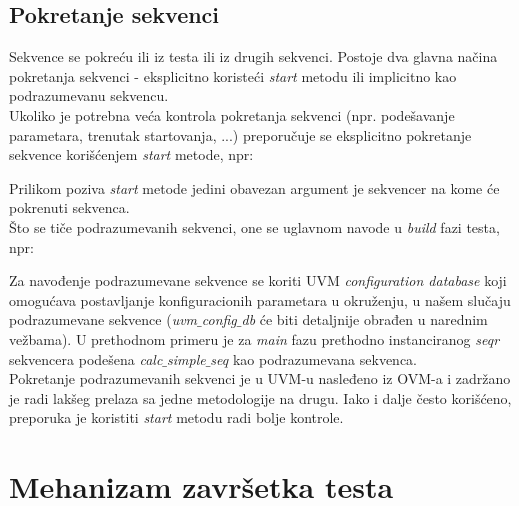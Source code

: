 
\subsection{Pokretanje sekvenci}

Sekvence se pokreću ili iz testa ili iz drugih sekvenci. Postoje dva glavna
načina pokretanja sekvenci - eksplicitno koristeći \emph{start} metodu ili
implicitno kao podrazumevanu sekvencu.\\

Ukoliko je potrebna veća kontrola pokretanja sekvenci (npr. podešavanje
parametara, trenutak startovanja, ...) preporučuje se eksplicitno pokretanje
sekvence korišćenjem \emph{start} metode, npr:



Prilikom poziva \emph{start} metode jedini obavezan argument je sekvencer na
kome će pokrenuti sekvenca.\\

Što se tiče podrazumevanih sekvenci, one se uglavnom navode u \emph{build} fazi
testa, npr:



Za navođenje podrazumevane sekvence se koriti UVM \emph{configuration database}
koji omogućava postavljanje konfiguracionih parametara u okruženju, u našem
slučaju podrazumevane sekvence (\emph{uvm\(\_\)config\(\_\)db} će biti
detaljnije obrađen u narednim vežbama). U prethodnom primeru je za \emph{main}
fazu prethodno instanciranog \emph{seqr} sekvencera podešena
\emph{calc\(\_\)simple\(\_\)seq} kao podrazumevana sekvenca.\\

Pokretanje podrazumevanih sekvenci je u UVM-u nasleđeno iz OVM-a i zadržano je
radi lakšeg prelaza sa jedne metodologije na drugu.
Iako i dalje često korišćeno, preporuka je koristiti \emph{start} metodu radi bolje kontrole.


\section{Mehanizam završetka testa}

